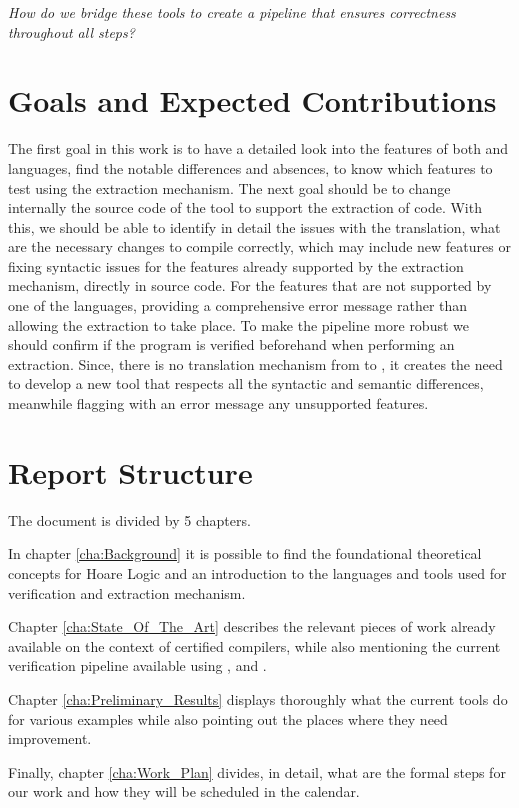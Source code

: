 \vspace{5mm}
\centerline{\textit{How do we bridge these tools to create a pipeline that ensures correctness throughout all steps?}}

\section{Goals and Expected Contributions}
\label{sec:Goals_and_Expected_Contributions}

The first goal in this work is to have a detailed look into the features of both \ocaml and \cml languages, find the notable 
differences and absences, to know which features to test using the extraction mechanism. The next goal should be to change 
internally the source code of the \cameleer tool to support the extraction of \cml code. With this, we should be able to identify
in detail the issues with the translation, what are the necessary changes to compile correctly, which may include new features
or fixing syntactic issues for the features already supported by the extraction mechanism, directly in \whythree source code.
For the features that are not supported by one of the languages, providing a comprehensive error message rather than allowing 
the extraction to take place. To make the pipeline more robust we should confirm if the program is verified beforehand when performing 
an extraction. Since, there is no translation mechanism from \cml to \ocaml, it creates the need to develop a new tool that respects all 
the syntactic and semantic differences, meanwhile flagging with an error message any unsupported features.

\section{Report Structure}
\label{sec:Report_Structure}

The document is divided by 5 chapters. 

In chapter \ref{cha:Background} it is possible to find the foundational theoretical concepts for Hoare Logic and an introduction to 
the languages and tools used for verification and extraction mechanism.

Chapter \ref{cha:State_Of_The_Art} describes the relevant pieces of work already available on the context of certified compilers, 
while also mentioning the current verification pipeline available using \cameleer, \whythree and \cml. 

Chapter \ref{cha:Preliminary_Results} displays thoroughly what the current tools do for various examples while also pointing out the 
places where they need improvement. 

Finally, chapter \ref{cha:Work_Plan} divides, in detail, what are the formal steps for our work and how they will be scheduled in 
the calendar.